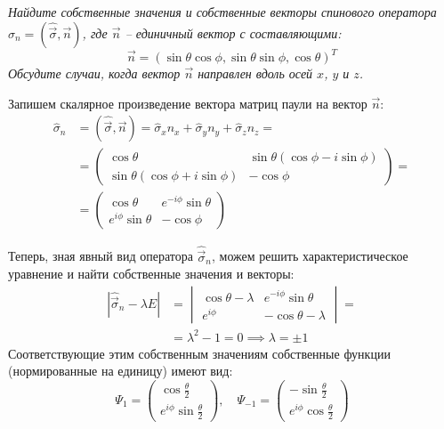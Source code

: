 \begin{center}
    \textit{Найдите собственные значения и собственные векторы спинового оператора $\hat{\sigma}_n = (\hat{\Vec{\sigma}}, \Vec{n})$, где $\Vec{n}$ -- единичный вектор с составляющими:}
    \[
    \Vec{n} = (\sin\theta\cos\phi, \sin\theta\sin\phi, \cos\theta)^T
    \]
    \textit{Обсудите случаи, когда вектор $\Vec{n}$ направлен вдоль осей $x$, $y$ и $z$.}
\end{center}

Запишем скалярное произведение вектора матриц паули на вектор $\Vec{n}$:
\begin{align*}
    \hat{\sigma}_n & = (\hat{\Vec{\sigma}}, \Vec{n})  = \hat{\sigma}_x n_x + \hat{\sigma}_y n_y + \hat{\sigma}_z n_z= \\ 
    & = \begin{pmatrix} \cos\theta & \sin\theta(\cos\phi - i\sin\phi) \\ \sin\theta(\cos\phi + i\sin\phi)  & -\cos\phi \end{pmatrix} = \\ 
    & = \begin{pmatrix} \cos\theta & e^{-i\phi} \sin\theta \\ e^{i\phi} \sin\theta & -\cos\phi \end{pmatrix}
\end{align*}

Теперь, зная явный вид оператора $\hat{\Vec{\sigma}}_n$, можем решить характеристическое уравнение и найти собственные значения и векторы:
\begin{align*}
    |\hat{\Vec{\sigma}}_{n} - \lambda E| & = \begin{vmatrix} \cos\theta - \lambda & e^{-i\phi}\sin\theta \\ e^{i\phi} & -\cos\theta - \lambda \end{vmatrix} = \\ 
    &= \lambda^2 - 1 = 0 \implies \lambda = \pm 1
\end{align*}
Соответствующие этим собственным значениям собственные функции (нормированные на единицу) имеют вид:
\[
\Psi_1 = \begin{pmatrix} \cos \frac{\theta}{2} \\ e^{i\phi} \sin\frac{\theta}{2}\end{pmatrix}, \quad
\Psi_{-1} = \begin{pmatrix} -\sin\frac{\theta}{2} \\ e^{i\phi}\cos\frac{\theta}{2} \end{pmatrix}
\]

